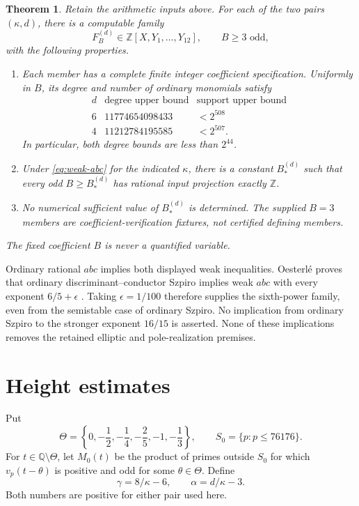 \documentclass[11pt,a4paper]{article}
\newtheorem{theorem}{Theorem}[section]
\newcommand{\Q}{\mathbb Q}\newcommand{\Z}{\mathbb Z}
\begin{document}
\begin{theorem}\label{thm:main}
Retain the arithmetic inputs above. For each of the two pairs
$(\kappa,d)$, there is a computable family
\[
 F_B^{(d)}\in\Z[X,Y_1,\ldots,Y_{12}],\qquad B\ge3\text{ odd},
\]
with the following properties.
\begin{enumerate}
\item Each member has a complete finite integer coefficient
specification. Uniformly in $B$, its degree and number of ordinary
monomials satisfy
\[
\begin{array}{c|r|c}
 d&\text{degree upper bound}&\text{support upper bound}\\\hline
 6&11774654098433&<2^{508}\\
 4&11212784195585&<2^{507}.
\end{array}
\]
In particular, both degree bounds are less than $2^{44}$.
\item Under \eqref{eq:weak-abc} for the indicated $\kappa$, there
is a constant $B_*^{(d)}$ such that every odd $B\ge B_*^{(d)}$
has rational input projection exactly $\Z$.
\item No numerical sufficient value of $B_*^{(d)}$ is determined.
The supplied $B=3$ members are coefficient-verification fixtures,
not certified defining members.
\end{enumerate}
The fixed coefficient $B$ is never a quantified variable.
\end{theorem}

Ordinary rational $abc$ implies both displayed weak inequalities.
Oesterl\'e proves that ordinary discriminant--conductor Szpiro implies
weak $abc$ with every exponent $6/5+\epsilon$
\cite[Section~I.3, p.~169]{Oesterle}. Taking $\epsilon=1/100$
therefore supplies the sixth-power family, even from the semistable
case of ordinary Szpiro. No implication from ordinary Szpiro to the
stronger exponent $16/15$ is asserted. None of these implications
removes the retained elliptic and pole-realization premises.

\section{Height estimates}

Put
\[
 \Theta=\left\{0,-\frac12,-\frac14,-\frac25,-1,-\frac13\right\},
 \qquad S_0=\{p:p\le76176\}.
\]
For $t\in\Q\setminus\Theta$, let $M_0(t)$ be the product of
primes outside $S_0$ for which $v_p(t-\theta)$ is positive
and odd for some $\theta\in\Theta$. Define
\[
                  \gamma=8/\kappa-6,\qquad \alpha=d/\kappa-3.
\]
Both numbers are positive for either pair used here.
\end{document}
